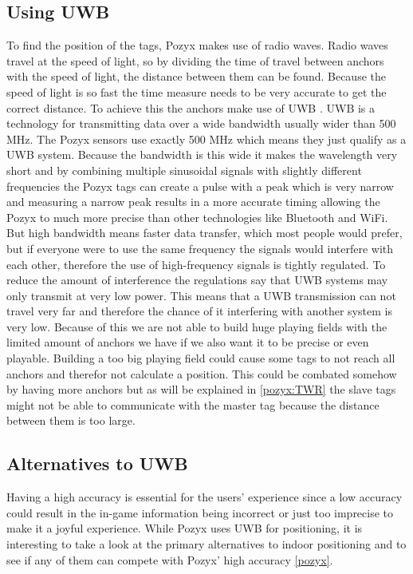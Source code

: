 \subsection{Using UWB}
To find the position of the tags, Pozyx makes use of radio waves. 
Radio waves travel at the speed of light, so by dividing the time of travel between anchors with the speed of light, the distance between them can be found.
Because the speed of light is so fast the time measure needs to be very accurate to get the correct distance.
To achieve this the anchors make use of UWB \cite{pozyx-UWB}.
UWB is a technology for transmitting data over a wide bandwidth usually wider than 500 MHz.
The Pozyx sensors use exactly 500 MHz which means they just qualify as a UWB system.
Because the bandwidth is this wide it makes the wavelength very short and by combining multiple sinusoidal signals with slightly different frequencies the Pozyx tags can create a pulse with a peak which is very narrow and measuring a narrow peak results in a more accurate timing allowing the Pozyx to much more precise than other technologies like Bluetooth and WiFi.
But high bandwidth means faster data transfer, which most people would prefer, but if everyone were to use the same frequency the signals would interfere with each other, therefore the use of high-frequency signals is tightly regulated\cite{tait-radio}.
To reduce the amount of interference the regulations say that UWB systems may only transmit at very low power.
This means that a UWB transmission can not travel very far and therefore the chance of it interfering with another system is very low.
Because of this we are not able to build huge playing fields with the limited amount of anchors we have if we also want it to be precise or even playable.
Building a too big playing field could cause some tags to not reach all anchors and therefor not calculate a position.
This could be combated somehow by having more anchors but as will be explained in \ref{pozyx:TWR} the slave tags might not be able to communicate with the master tag because the distance between them is too large.

\subsection{Alternatives to UWB}
Having a high accuracy is essential for the users' experience since a low accuracy could result in the in-game information being incorrect or just too imprecise to make it a joyful experience.
While Pozyx uses UWB for positioning, it is interesting to take a look at the primary alternatives to indoor positioning and to see if any of them can compete with Pozyx' high accuracy \ref{pozyx}.

